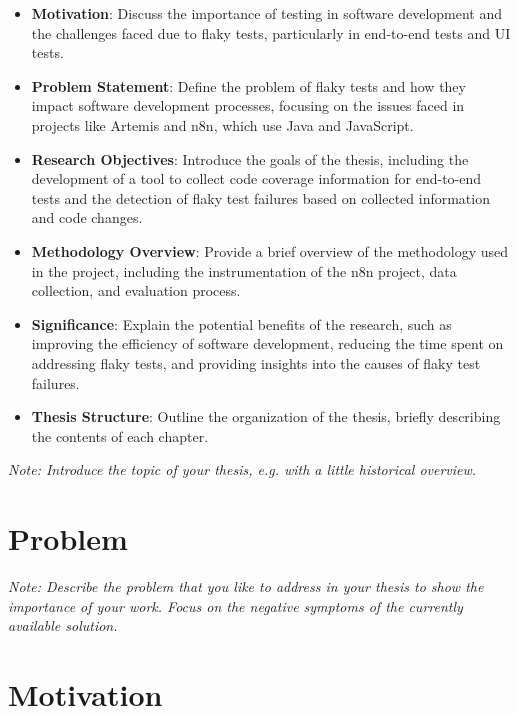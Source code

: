 \begin{itemize}
	\item \textbf{Motivation}: Discuss the importance of testing in software development and the challenges faced due to flaky tests, particularly in end-to-end tests and UI tests.

	\item \textbf{Problem Statement}: Define the problem of flaky tests and how they impact software development processes, focusing on the issues faced in projects like Artemis and n8n, which use Java and JavaScript.

	\item \textbf{Research Objectives}: Introduce the goals of the thesis, including the development of a tool to collect code coverage information for end-to-end tests and the detection of flaky test failures based on collected information and code changes.

	\item \textbf{Methodology Overview}: Provide a brief overview of the methodology used in the project, including the instrumentation of the n8n project, data collection, and evaluation process.

	\item \textbf{Significance}: Explain the potential benefits of the research, such as improving the efficiency of software development, reducing the time spent on addressing flaky tests, and providing insights into the causes of flaky test failures.

	\item \textbf{Thesis Structure}: Outline the organization of the thesis, briefly describing the contents of each chapter.
\end{itemize}

\textit{Note: Introduce the topic of your thesis, e.g. with a little historical overview.}

\section{Problem}

\textit{Note: Describe the problem that you like to address in your thesis to show the importance of your work. Focus on the negative symptoms of the currently available solution.}

\section{Motivation}

